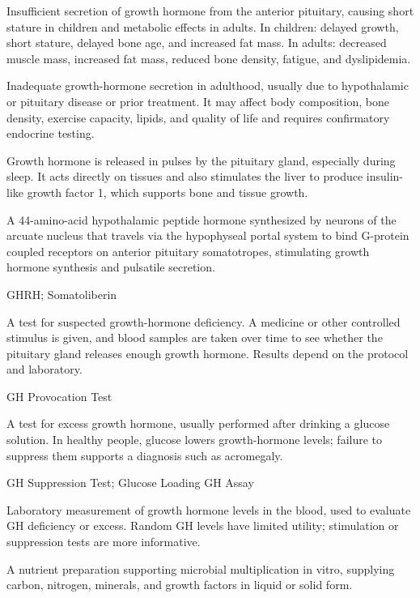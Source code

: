  Insufficient secretion of growth hormone from the anterior pituitary, causing short
stature in children and metabolic effects in adults. In children: delayed growth, short
stature, delayed bone age, and increased fat mass. In adults: decreased muscle mass,
increased fat mass, reduced bone density, fatigue, and dyslipidemia.

 Inadequate growth-hormone secretion in adulthood, usually due to hypothalamic or pituitary disease or prior treatment. It may affect body composition, bone density, exercise capacity, lipids, and quality of life and requires confirmatory endocrine testing.

 Growth hormone is released in pulses by the pituitary gland, especially during sleep. It acts directly on tissues and also stimulates the liver to produce insulin-like growth factor 1, which supports bone and tissue growth.

 A 44-amino-acid hypothalamic peptide hormone synthesized by neurons of the arcuate nucleus that travels via the hypophyseal portal system to bind G-protein coupled receptors on anterior pituitary somatotropes, stimulating growth hormone synthesis and pulsatile secretion.

\synonyms
GHRH; Somatoliberin

 A test for suspected growth-hormone deficiency. A medicine or other controlled stimulus is given, and blood samples are taken over time to see whether the pituitary gland releases enough growth hormone. Results depend on the protocol and laboratory.

\synonyms
GH Provocation Test

 A test for excess growth hormone, usually performed after drinking a glucose solution. In healthy people, glucose lowers growth-hormone levels; failure to suppress them supports a diagnosis such as acromegaly.

\synonyms
GH Suppression Test; Glucose Loading GH Assay

 Laboratory measurement of growth hormone levels in the blood, used to evaluate GH deficiency or excess. Random GH levels have limited utility; stimulation or suppression tests are more informative.

 A nutrient preparation supporting microbial multiplication in vitro, supplying carbon,
nitrogen, minerals, and growth factors in liquid or solid form.

